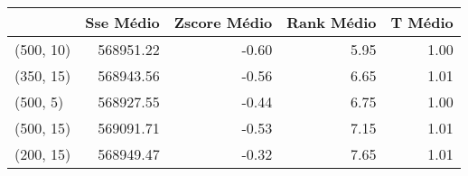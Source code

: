 \begin{table}
\centering
\label{tab:train_bests_GRASP}
\begin{tabular}{lrrrr}
\toprule
{} &  Sse Médio &  Zscore Médio &  Rank Médio &  T Médio \\
\midrule
(500, 10) &  568951.22 &         -0.60 &        5.95 &     1.00 \\
(350, 15) &  568943.56 &         -0.56 &        6.65 &     1.01 \\
(500, 5)  &  568927.55 &         -0.44 &        6.75 &     1.00 \\
(500, 15) &  569091.71 &         -0.53 &        7.15 &     1.01 \\
(200, 15) &  568949.47 &         -0.32 &        7.65 &     1.01 \\
\bottomrule
\end{tabular}
\end{table}
